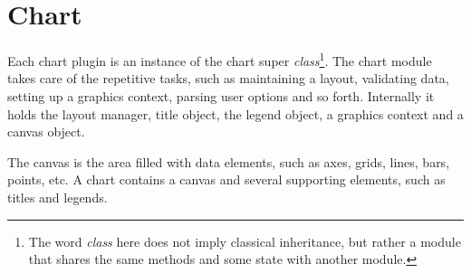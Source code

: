 \section{Chart}
Each chart plugin is an instance of the chart super \emph{class}\footnote{The word \emph{class} here does not imply classical inheritance, but rather a module that shares the same methods and some state with another module.}. The chart module takes care of the repetitive tasks, such as maintaining a layout, validating data, setting up a graphics context, parsing user options and so forth. Internally it holds the layout manager, title object, the legend object, a graphics context and a canvas object.

The canvas is the area filled with data elements, such as axes, grids, lines, bars, points, etc. A chart contains a canvas and several supporting elements, such as titles and legends.
